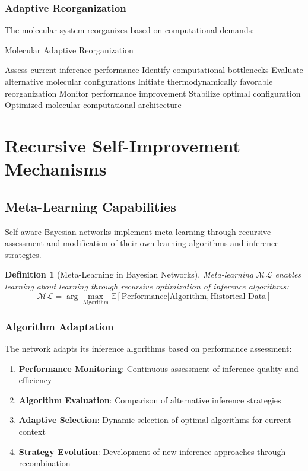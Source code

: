 \documentclass[12pt,a4paper]{article}
\newtheorem{definition}[theorem]{Definition}
\begin{document}
\subsubsection{Adaptive Reorganization}

The molecular system reorganizes based on computational demands:

\begin{algorithm}
\caption{Molecular Adaptive Reorganization}
\begin{algorithmic}[1]
\STATE Assess current inference performance
\STATE Identify computational bottlenecks
\STATE Evaluate alternative molecular configurations
\STATE Initiate thermodynamically favorable reorganization
\STATE Monitor performance improvement
\STATE Stabilize optimal configuration
\RETURN Optimized molecular computational architecture
\end{algorithmic}
\end{algorithm}

\section{Recursive Self-Improvement Mechanisms}

\subsection{Meta-Learning Capabilities}

Self-aware Bayesian networks implement meta-learning through recursive assessment and modification of their own learning algorithms and inference strategies.

\begin{definition}[Meta-Learning in Bayesian Networks]
Meta-learning $\mathcal{ML}$ enables learning about learning through recursive optimization of inference algorithms:
\begin{equation}
\mathcal{ML} = \arg\max_{\text{Algorithm}} \mathbb{E}[\text{Performance} | \text{Algorithm}, \text{Historical Data}]
\end{equation}
\end{definition}

\subsubsection{Algorithm Adaptation}

The network adapts its inference algorithms based on performance assessment:

\begin{enumerate}
\item \textbf{Performance Monitoring}: Continuous assessment of inference quality and efficiency
\item \textbf{Algorithm Evaluation}: Comparison of alternative inference strategies
\item \textbf{Adaptive Selection}: Dynamic selection of optimal algorithms for current context
\item \textbf{Strategy Evolution}: Development of new inference approaches through recombination
\end{enumerate}
\end{document}
